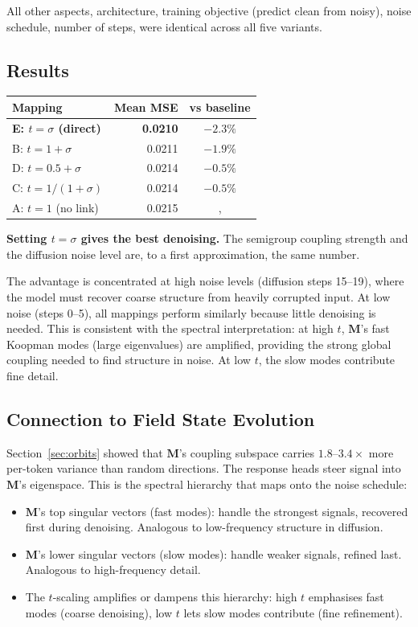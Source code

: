 \documentclass[11pt, a4paper]{article}
\newcommand{\M}{\mathbf{M}}
\theoremstyle{plain}
\theoremstyle{remark}
\begin{document}
All other aspects, architecture, training objective (predict clean from noisy), noise schedule, number of steps, were identical across all five variants.

\subsection{Results}

\begin{center}\small
\begin{tabular}{@{}lrc@{}}
\toprule
\textbf{Mapping} & \textbf{Mean MSE} & \textbf{vs baseline} \\
\midrule
\textbf{E: $t = \sigma$ (direct)} & \textbf{0.0210} & $\mathbf{-2.3\%}$ \\
B: $t = 1+\sigma$ & 0.0211 & $-1.9\%$ \\
D: $t = 0.5+\sigma$ & 0.0214 & $-0.5\%$ \\
C: $t = 1/(1+\sigma)$ & 0.0214 & $-0.5\%$ \\
A: $t = 1$ (no link) & 0.0215 & ,  \\
\bottomrule
\end{tabular}
\end{center}

\textbf{Setting $t = \sigma$ gives the best denoising.}
The semigroup coupling strength and the diffusion noise level are, to a first approximation, the same number.

The advantage is concentrated at high noise levels (diffusion steps 15--19), where the model must recover coarse structure from heavily corrupted input.
At low noise (steps 0--5), all mappings perform similarly because little denoising is needed.
This is consistent with the spectral interpretation: at high $t$, $\M$'s fast Koopman modes (large eigenvalues) are amplified, providing the strong global coupling needed to find structure in noise.
At low $t$, the slow modes contribute fine detail.

\subsection{Connection to Field State Evolution}

Section~\ref{sec:orbits} showed that $\M$'s coupling subspace carries $1.8$--$3.4\times$ more per-token variance than random directions.
The response heads steer signal into $\M$'s eigenspace.
This is the spectral hierarchy that maps onto the noise schedule:
\begin{itemize}[nosep]
    \item $\M$'s top singular vectors (fast modes): handle the strongest signals, recovered first during denoising.  Analogous to low-frequency structure in diffusion.
    \item $\M$'s lower singular vectors (slow modes): handle weaker signals, refined last.  Analogous to high-frequency detail.
    \item The $t$-scaling amplifies or dampens this hierarchy: high $t$ emphasises fast modes (coarse denoising), low $t$ lets slow modes contribute (fine refinement).
\end{itemize}
\end{document}
